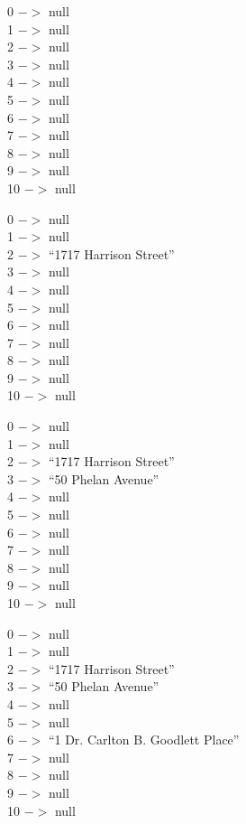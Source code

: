 \documentclass[10pt]{article}
\begin{document}
\begin{enumerate}
			\vspace{0.5cm}
			0 $->$ null\\
			1 $->$ null\\
			2 $->$ null\\
			3 $->$ null\\
			4 $->$ null\\
			5 $->$ null\\
			6 $->$ null\\
			7 $->$ null\\
			8 $->$ null\\
			9 $->$ null\\
			10 $->$ null
			
			\vspace{0.5cm}
			0 $->$ null\\
			1 $->$ null\\
			2 $->$ ``1717 Harrison Street''\\
			3 $->$ null\\
			4 $->$ null\\
			5 $->$ null\\
			6 $->$ null\\
			7 $->$ null\\
			8 $->$ null\\
			9 $->$ null\\
			10 $->$ null
			
			\vspace{0.5cm}
			0 $->$ null\\
			1 $->$ null\\
			2 $->$ ``1717 Harrison Street''\\
			3 $->$ ``50 Phelan Avenue''\\
			4 $->$ null\\
			5 $->$ null\\
			6 $->$ null\\
			7 $->$ null\\
			8 $->$ null\\
			9 $->$ null\\
			10 $->$ null
			
			\vspace{0.5cm}
			0 $->$ null\\
			1 $->$ null\\
			2 $->$ ``1717 Harrison Street''\\
			3 $->$ ``50 Phelan Avenue''\\
			4 $->$ null\\
			5 $->$ null\\
			6 $->$ ``1 Dr. Carlton B. Goodlett Place''\\
			7 $->$ null\\
			8 $->$ null\\
			9 $->$ null\\
			10 $->$ null
			

\end{enumerate}
\end{document}

